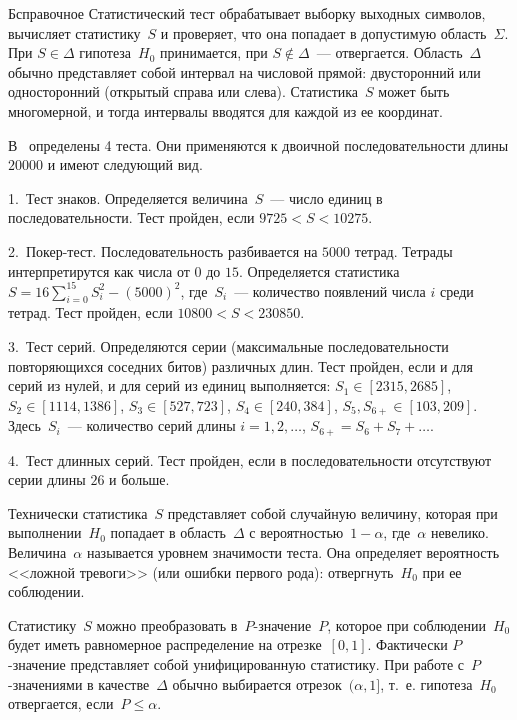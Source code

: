 \begin{appendix}{Б}{справочное}
Статистический тест обрабатывает выборку выходных символов, 
вычисляет статистику~$S$ и проверяет, что она попадает
в допустимую область~$\Sigma$. При $S\in\Delta$ гипотеза~$H_0$ принимается,
при $S\notin\Delta$~--- отвергается. Область~$\Delta$ обычно представляет
собой интервал на числовой прямой: двусторонний или односторонний 
(открытый справа или слева). Статистика~$S$ может быть многомерной,
и тогда интервалы вводятся для каждой из ее координат.

\begin{example}
В~\cite{FIPS140-2} определены 4 теста. Они применяются к двоичной 
последовательности длины $20000$ и имеют следующий вид.

1.~Тест знаков. Определяется величина~$S$~--- 
число единиц в последовательности. 
Тест пройден, если $9725<S<10275$.

2.~Покер-тест. Последовательность разбивается на $5000$ тетрад.
Тетрады интерпретирутся как числа от $0$ до $15$.
Определяется статистика~$S=16\sum_{i=0}^{15}S_i^2-(5000)^2$,
где~$S_i$~--- количество появлений числа $i$ среди тетрад.
Тест пройден, если $10800<S<230850$.

3.~Тест серий. Определяются серии (максимальные последовательности 
повторяющихся соседних битов) различных длин. 
Тест пройден, если и для серий из нулей, и для серий из единиц выполняется: 
$S_1\in[2315,2685]$,
$S_2\in[1114,1386]$,
$S_3\in[527,723]$,
$S_4\in[240,384]$,
$S_5,S_{6+}\in[103,209]$.
Здесь~$S_i$~--- количество серий длины $i=1,2,\ldots$, 
$S_{6+}=S_6+S_7+\ldots$.

4.~Тест длинных серий. Тест пройден, если в последовательности отсутствуют 
серии длины $26$ и больше.
\end{example}

Технически статистика~$S$ представляет собой случайную величину, 
которая при выполнении~$H_0$ попадает в область~$\Delta$ 
с вероятностью~$1-\alpha$, где~$\alpha$ невелико.
%
Величина~$\alpha$ называется уровнем значимости теста. 
%
Она определяет вероятность <<ложной тревоги>> (или ошибки первого рода): 
отвергнуть~$H_0$ при ее соблюдении.

Статистику~$S$ можно преобразовать в~$P$-значение~$P$, 
которое при соблюдении~$H_0$ будет иметь равномерное распределение на 
отрезке~$[0,1]$. Фактически $P$-значение представляет собой унифицированную 
статистику. При работе с~$P$-значениями в качестве~$\Delta$ обычно выбирается
отрезок~$(\alpha,1]$, т.~е. гипотеза~$H_0$ отвергается, если~$P\leq\alpha$.


\end{appendix}
